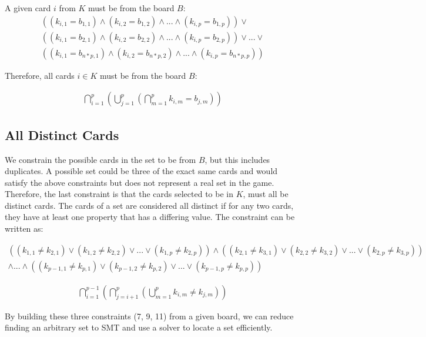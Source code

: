 \documentclass[pageno]{jpaper}
\begin{document}
A given card $i$ from $K$ must be from the board $B$:
\begin{multline}
	((k_{i,1} = b_{1,1}) \wedge (k_{i,2} = b_{1,2}) \wedge ... \wedge (k_{i,p} = b_{1,p})) \vee \\
	 ((k_{i,1} = b_{2,1}) \wedge (k_{i,2} = b_{2,2}) \wedge ... \wedge (k_{i,p} = b_{2,p}))  \vee ... \vee \\ ((k_{i,1} = b_{n*p,1}) \wedge (k_{i,2} = b_{n*p,2}) \wedge ... \wedge (k_{i,p} = b_{n*p,p})) 
\end{multline}

Therefore, all cards $i \in K$ must be from the board $B$:
 
\begin{align}
	\bigcap \limits_{i=1}^{p}  \left( \bigcup \limits_{j = 1}^{p}  \left( \bigcap \limits_{m=1}^{p}  k_{i,m} = b_{j,m}\right) \right)
\end{align}

\subsection{All Distinct Cards}

We constrain the possible cards in the set to be from $B$, but this includes duplicates. A possible set could be three of the exact same cards and would satisfy the above constraints but does not represent a real set in the game. Therefore, the last constraint is that the cards selected to be in $K$, must all be distinct cards. The cards of a set are considered all distinct if for any two cards, they have at least one property that has a differing value. The constraint can be written as:

\begin{multline}
	((k_{1,1} \neq k_{2,1}) \vee (k_{1,2} \neq k_{2,2}) \vee ... \vee (k_{1,p} \neq k_{2,p}))  
	 \wedge ((k_{2,1} \neq k_{3,1}) \vee (k_{2,2} \neq k_{3,2}) \vee ... \vee (k_{2,p} \neq k_{3,p})) \\ \wedge  ... \wedge ((k_{p-1,1} \neq k_{p,1}) \vee (k_{p-1,2} \neq k_{p,2}) \vee ... \vee (k_{p-1,p} \neq k_{p,p})) 
\end{multline}



\begin{align}
	\bigcap \limits_{i=1}^{p-1}   \left( \bigcap \limits_{j=i+1}^{p}   \left( \bigcup \limits_{m = 1}^{p} k_{i,m} \neq k_{j,m} \right)  \right)
\end{align}

By building these three constraints (7, 9, 11) from a given board, we can reduce finding an arbitrary set to SMT and use a solver to locate a set efficiently. 
\end{document}
